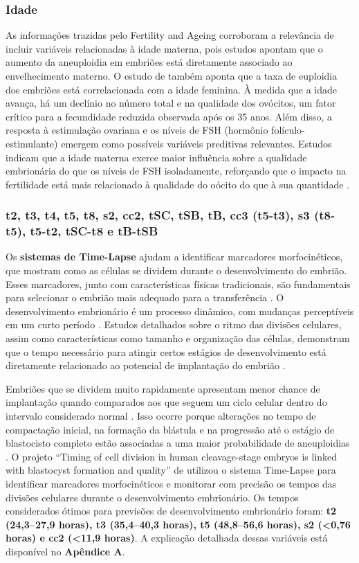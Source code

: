 \subsubsection{Idade}
As informações trazidas pelo Fertility and Ageing corroboram a relevância de incluir variáveis relacionadas à idade materna, pois estudos apontam que o aumento da aneuploidia em embriões está diretamente associado ao envelhecimento materno. O estudo de  também aponta que a taxa de euploidia dos embriões está correlacionada com a idade feminina. À medida que a idade avança, há um declínio no número total e na qualidade dos ovócitos, um fator crítico para a fecundidade reduzida observada após os 35 anos. Além disso, a resposta à estimulação ovariana e os níveis de FSH (hormônio folículo-estimulante) emergem como possíveis variáveis preditivas relevantes. Estudos indicam que a idade materna exerce maior influência sobre a qualidade embrionária do que os níveis de FSH isoladamente, reforçando que o impacto na fertilidade está mais relacionado à qualidade do oócito do que à sua quantidade \cite{eshre2005}.

\subsubsection{t2, t3, t4, t5, t8, s2, cc2, tSC, tSB, tB, cc3 (t5-t3), s3 (t8-t5), t5-t2,  tSC-t8 e tB-tSB}
Os \textbf{sistemas de Time-Lapse} ajudam a identificar marcadores morfocinéticos, que mostram como as células se dividem durante o desenvolvimento do embrião. Esses marcadores, junto com características físicas tradicionais, são fundamentais para selecionar o embrião mais adequado para a transferência \cite{souzarebeca2022}. O desenvolvimento embrionário é um processo dinâmico, com mudanças perceptíveis em um curto período \cite{cruz2012}. Estudos detalhados sobre o ritmo das divisões celulares, assim como características como tamanho e organização das células, demonstram que o tempo necessário para atingir certos estágios de desenvolvimento está diretamente relacionado ao potencial de implantação do embrião \cite{souzarebeca2022}.

Embriões que se dividem muito rapidamente apresentam menor chance de implantação quando comparados aos que seguem um ciclo celular dentro do intervalo considerado normal  \cite{cruz2012}. Isso ocorre porque alterações no tempo de compactação inicial, na formação da blástula e na progressão até o estágio de blastocisto completo estão associadas a uma maior probabilidade de aneuploidias \cite{cruz2012}. O projeto “Timing of cell division in human cleavage-stage embryos is linked with blastocyst formation and quality” de  utilizou o sistema Time-Lapse para identificar marcadores morfocinéticos e monitorar com precisão os tempos das divisões celulares durante o desenvolvimento embrionário. Os tempos considerados ótimos para previsões de desenvolvimento embrionário foram: \textbf{t2 (24,3–27,9 horas), t3 (35,4–40,3 horas), t5 (48,8–56,6 horas), s2 (<0,76 horas) e cc2 (<11,9 horas)}. A explicação detalhada dessas variáveis está disponível no \textbf{Apêndice A}. 

